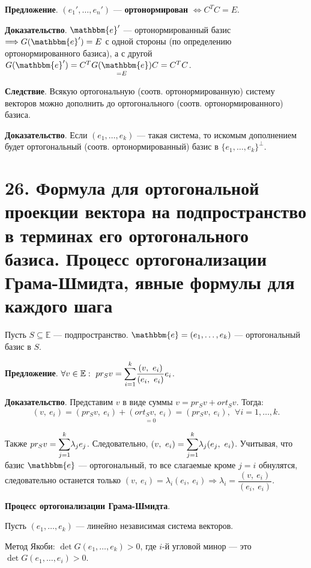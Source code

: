 \documentclass[a4paper, 12pt]{article}
\newcommand{\E}{\mathbb{E}}
\newcommand{\me}{\mathbbm{e}}
\begin{document}
\textbf{Предложение}. $(e_1', \ldots, e_n')$ --- \textbf{ортонормирован} $\Longleftrightarrow C^TC = E$.

\textbf{Доказательство}. $\me'$ --- ортонормированный базис $\Longrightarrow G(\me') = E$ с одной стороны (по определению ортонормированного базиса), а с другой $G(\me') = C^T\underset{=E}{G(\me)}C = C^TC$.

\vspace{5mm}
\textbf{Следствие}. Всякую ортогональную (соотв. ортонормированную) систему векторов можно дополнить до ортогонального (соотв. ортонормированного) базиса.

\textbf{Доказательство}. Если $(e_1, \ldots, e_k)$ --- такая система, то искомым дополнением будет ортогональный (соотв. ортонормированный) базис в $\{e_1, \ldots, e_k\}^\bot$.

\section*{26. Формула для ортогональной проекции вектора на подпространство в терминах его ортогонального базиса. Процесс ортогонализации Грама-Шмидта, явные формулы для каждого шага}
Пусть $S \subseteq \E$ --- подпространство. $\me = (e_1, \ldots, e_k)$ --- ортогональный базис в $S$.

\textbf{Предложение}. $\forall v \in \E:\ pr_Sv = \mathlarger{\sum}\limits_{i = 1}^{k}\dfrac{(v,\ e_i)}{(e_i,\ e_i)}e_i$.

\textbf{Доказательство}. Представим $v$ в виде суммы $v = pr_Sv + ort_Sv$. Тогда:
\vspace{-3mm}
\[
(v,\ e_i) = (pr_Sv,\ e_i) + \underset{=0}{(ort_Sv,\ e_i)} = (pr_Sv,\ e_i),\ \ \forall i = 1, \ldots, k.
\]

\vspace{-3mm}
Также $pr_Sv = \mathlarger{\sum}\limits_{j = 1}^{k}\lambda_je_j$. Следовательно, $(v,\ e_i) = \mathlarger{\sum}\limits_{j = 1}^{k}\lambda_j(e_j,\ e_i)$. Учитывая, что базис $\me$ --- ортогональный, то все слагаемые кроме $j = i$ обнулятся, следовательно останется только $(v,\ e_i) = \lambda_i(e_i,\ e_i) \Longrightarrow \lambda_i = \dfrac{(v,\ e_i)}{(e_i,\ e_i)}$.

\vspace{5mm}
\textbf{Процесс ортогонализации Грама-Шмидта}.

Пусть $(e_1, \ldots, e_k)$ --- линейно независимая система векторов.

Метод Якоби: $\det G(e_1, \ldots, e_k) > 0$, где $i$-й угловой минор --- это $\det G(e_1, \ldots, e_i) > 0$.
\end{document}
